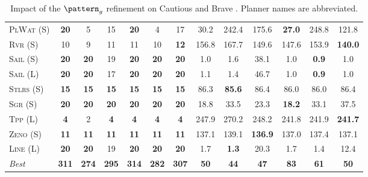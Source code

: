 \documentclass[11pt,landscape]{article}
\begin{document}
\begin{table}[tb]
{\begin{tabular}{|l||cccccc||cccccc||}
\textsc{PlWat} (S)&\textbf{20}&5&15&\textbf{20}&4&17&30.2&242.4&175.6&\textbf{27.0}&248.8&121.8\\
\textsc{Rvr} (S)&10&9&11&11&10&\textbf{12}&156.8&167.7&149.6&147.6&153.9&\textbf{140.0}\\
\textsc{Sail} (S)&\textbf{20}&\textbf{20}&19&\textbf{20}&\textbf{20}&\textbf{20}&1.0&1.6&38.1&1.0&\textbf{0.9}&1.0\\
\textsc{Sail} (L)&\textbf{20}&\textbf{20}&17&\textbf{20}&\textbf{20}&\textbf{20}&1.1&1.4&46.7&1.0&\textbf{0.9}&1.0\\
\textsc{Stlrs} (S)&\textbf{15}&\textbf{15}&\textbf{15}&\textbf{15}&\textbf{15}&\textbf{15}&86.3&\textbf{85.6}&86.4&86.0&86.0&86.4\\
\textsc{Sgr} (S)&\textbf{20}&\textbf{20}&\textbf{20}&\textbf{20}&\textbf{20}&\textbf{20}&18.8&33.5&23.3&\textbf{18.2}&33.1&37.5\\
\textsc{Tpp} (L)&\textbf{4}&2&\textbf{4}&\textbf{4}&\textbf{4}&\textbf{4}&247.9&270.2&248.2&241.8&241.9&\textbf{241.7}\\
\textsc{Zeno} (S)&\textbf{11}&\textbf{11}&\textbf{11}&\textbf{11}&\textbf{11}&\textbf{11}&137.1&139.1&\textbf{136.9}&137.0&137.4&137.1\\
\textsc{Line} (L)&\textbf{20}&\textbf{20}&19&\textbf{20}&\textbf{20}&\textbf{20}&1.7&\textbf{1.3}&20.3&1.7&1.4&12.4
\\\hline
\textit{Best}&\textbf{311}&\textbf{274}&\textbf{295}&\textbf{314}&\textbf{282}&\textbf{307}&\textbf{50}&\textbf{44}&\textbf{47}&\textbf{83}&\textbf{61}&\textbf{50}\\\hline

        \end{tabular}}
        \caption{Impact of the $\pattern_g$ refinement on Cautious and Brave \pattyd. Planner names are abbreviated.}
        \label{tab:abl-patterng}
        \end{table}
        
\end{document}
